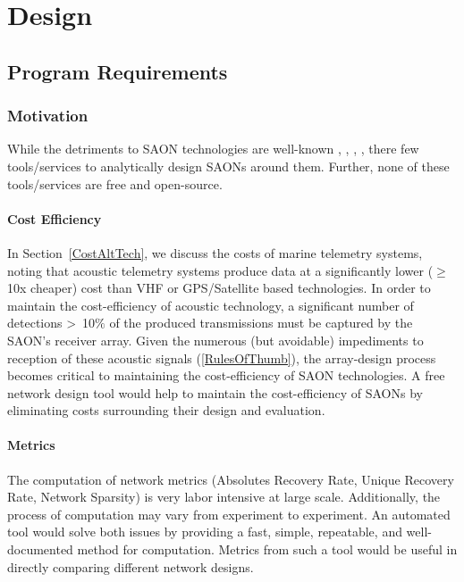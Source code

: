 \chapter{Design}
\label{design}
\section{Program Requirements}
\label{programRequirements}

\subsection{Motivation}
While the detriments to SAON technologies are well-known \cite{Akbarzadeh2013}, \cite{Heupel2006}, \cite{Howard2002},  \cite{Kessel2015}, \cite{Steel2014} there few tools/services to analytically design SAONs around them.  Further, none of these tools/services are free and open-source.


\subsubsection{Cost Efficiency}
\label{motivationCost}
In Section~\ref{CostAltTech}, we discuss the costs of marine telemetry systems, noting that acoustic telemetry systems produce data at a significantly lower ($\ge$10x cheaper) cost than VHF or GPS/Satellite based technologies.  In order to maintain the cost-efficiency of acoustic technology, a significant number of detections >~10$\%$ of the produced transmissions must be captured by the SAON's receiver array.  Given the numerous (but avoidable) impediments to reception of these acoustic signals (\ref{RulesOfThumb}), the array-design process becomes critical to maintaining the cost-efficiency of SAON technologies.  A free network design tool would help to maintain the cost-efficiency of SAONs by eliminating costs surrounding their design and evaluation.  


\subsubsection{Metrics}
\label{motivationMetrics}
The computation of network metrics (Absolutes Recovery Rate, Unique Recovery Rate, Network Sparsity) is very labor intensive at large scale.  Additionally, the process of computation may vary from experiment to experiment.  An automated tool would solve both issues by providing a fast, simple, repeatable, and well-documented method for computation.  Metrics from such a tool would be useful in directly comparing different network designs.


